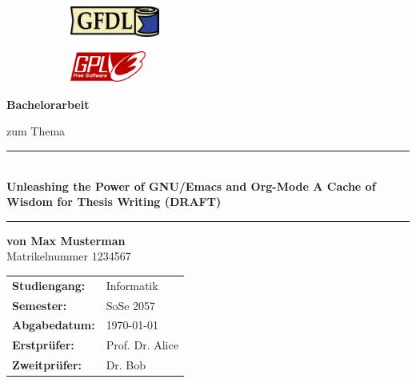
\begin{titlepage}

	\begin{figure}[!h]
		\begin{subfigure}[b]{0.5\linewidth}
			\includegraphics[height=1cm]{./images/gfdl}
		\end{subfigure}
		\hfill
		\begin{subfigure}[b]{0.15\linewidth}
			\includegraphics[height=1cm]{./images/gplv3}
		\end{subfigure}
	\end{figure}

	\begin{center}
		\textbf{\LARGE{Bachelorarbeit}}

		\vspace{.5cm}


		\vspace{.5cm}

		zum Thema

		\vspace{1cm}
		\rule{\textwidth}{2pt}
		$~~$\\

		\textbf{
			\LARGE{Unleashing the Power of GNU/Emacs and Org-Mode} \break
			\Large{A Cache of Wisdom for Thesis Writing} \break
			(DRAFT)
		}

		\rule{\textwidth}{2pt}
		\vspace{2cm}

		\textbf{von \Large{Max Musterman}}\\
		\Large{Matrikelnummer  1234567}\\
	\end{center}

	\vspace{5cm}


	\begin{tabular}{ll}
		\textbf{Studiengang:} & Informatik      \\
		\textbf{Semester:}    & SoSe 2057       \\
		\textbf{Abgabedatum:} & \today          \\
		\textbf{Erstprüfer:}  & Prof. Dr. Alice \\
		\textbf{Zweitprüfer:} & Dr. Bob         \\
	\end{tabular}


\end{titlepage}
